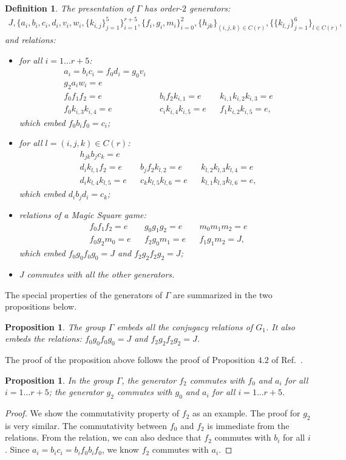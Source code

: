 \documentclass[11pt,letterpaper]{article}
\newcommand{\1}{\mathbb{1}}
\newtheorem{proposition}[theorem]{Proposition}
\newtheorem{definition}[theorem]{Definition}
\theoremstyle{definition}
\begin{document}
\begin{definition}
\label{def:gamma}
The presentation of $\Gamma$ has order-$2$ generators:
\begin{align*}
	J, \{a_i, b_i, c_i, d_i, v_i,w_i,\{ k_{i,j} \}_{j=1}^5\}_{i=1}^{r+5}, \{f_i,g_i,m_i\}_{i=0}^2, \{h_{jk}\}_{(i,j,k) \in C(r)}, 
	\{\{ k_{l,j} \}_{j=1}^6\}_{l \in C(r)},
\end{align*}
and relations:
\begin{itemize}
\item for all $i = 1 \dots r+5$:
\begin{align*}
	&a_i = b_ic_i = f_0d_i = g_0v_i \\
	&g_2 a_i w_i = e \\
	&f_0 f_1 f_2 = e && b_i f_2 k_{i,1} = e && k_{i,1} k_{i,2} k_{i,3} = e\\
	&f_0 k_{i,3} k_{i,4} = e && c_i k_{i,4} k_{i,5} =e && f_1 k_{i,2} k_{i,5} = e,
\end{align*}
which embed $f_0 b_i f_0 = c_i$;
\item for all $ l = (i,j,k) \in C(r)$:
\begin{align*}
	&h_{jk}b_j c_k = e\\
	&d_i k_{l,1} f_2 = e && b_j f_2 k_{l,2} = e && k_{l,2} k_{l,3} k_{l,4} = e\\
	&d_i k_{l,4} k_{l,5} = e && c_k k_{l,5} k_{l,6} =e && k_{l,1} k_{l,3} k_{l,6} = e,
\end{align*}
which embed $d_i b_j d_i = c_k$;
\item relations of a Magic Square game:
\begin{align*}
	&f_0 f_1 f_2 = e && g_0 g_1 g_2 = e &&m_0 m_1 m_2 = e \\
	&f_0 g_2 m_0 = e && f_2 g_0 m_1 = e && f_1 g_1 m_2 = J,
\end{align*}
which embed $f_0 g_0 f_0 g_0 = J$ and $f_2 g_2 f_2 g_2 = J$;
\item $J$ commutes with all the other generators.
\end{itemize}
\end{definition}
The special properties of the generators of $\Gamma$ are summarized in the two propositions below.
\begin{proposition}
	The group $\Gamma$ embeds all the conjugacy relations of $G_1$.
	It also embeds the relations: $f_0 g_0 f_0 g_0 = J$ and $f_2 g_2 f_2 g_2 = J$.
\end{proposition}
The proof of the proposition above follows the proof of Proposition $4.2$ of Ref.~\cite{slofstra2017}.
\begin{proposition}
	In the group $\Gamma$, the generator $f_2$ commutes with $f_0$ and $a_i$ for all $i = 1 \dots r+5$;
	the generator $g_2$ commutes with $g_0$ and $a_i$ for all $i = 1 \dots r+5$.
\end{proposition}
\begin{proof}
	We show the commutativity property of $f_2$ as an example. The proof for $g_2$ is very similar.
	The commutativity between $f_0$ and $f_2$ is immediate from the relations.
	From the relation, we can also deduce that $f_2$ commutes with $b_i$ for all $i$.
	Since $a_i =b_ic_i = b_i f_0 b_i f_0$, we know $f_2$ commutes with $a_i$.
\end{proof}
\end{document}
